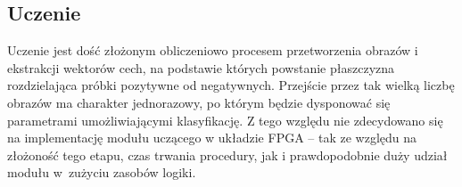 
\subsection{Uczenie}
Uczenie jest dość złożonym obliczeniowo procesem przetworzenia obrazów i ekstrakcji wektorów cech, na podstawie których powstanie płaszczyzna rozdzielająca próbki pozytywne od negatywnych. 
Przejście przez tak wielką liczbę obrazów ma charakter jednorazowy, po którym będzie dysponować się parametrami umożliwiającymi klasyfikację. 
Z tego względu nie zdecydowano się na implementację modułu uczącego w układzie FPGA -- tak ze względu na złożoność tego etapu, czas trwania procedury, jak i prawdopodobnie duży udział modułu w~zużyciu zasobów logiki. 

